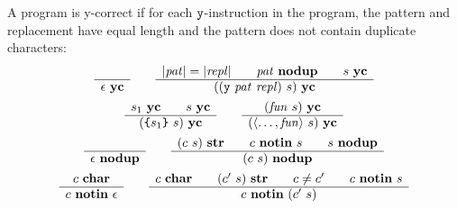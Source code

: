 \documentclass[11pt]{article}
\newcommand\RULE[3][]{\begin{array}{c} #2 \\ \hline #3 \end{array}}
\newcommand\J[1]{\ensuremath{\textbf{#1}}}
\newcommand\cmd[1]{\ensuremath{\text{\texttt{#1}}}}
\renewcommand\arg[1]{\ensuremath{\mathit{#1}}}
\newcommand\angles[1]{\langle #1 \rangle}
\begin{document}
A program is y-correct if for each \cmd{y}-instruction in the program, the pattern and replacement have equal length and the pattern does not contain duplicate characters:
\begin{gather*}
	\RULE{}{\epsilon\ \J{yc}} \qquad
	\RULE{|\arg{pat}| = |\arg{repl}| \qquad \arg{pat}\ \J{nodup} \qquad s\ \J{yc}}{((\cmd{y}\ \arg{pat}\ \arg{repl})\ s)\ \J{yc}} \\
%
	\RULE{s_1\ \J{yc} \qquad s\ \J{yc}}{(\cmd{\{} s_1 \cmd{\}}\ s)\ \J{yc}} \qquad
	\RULE{(\arg{fun}\ s)\ \J{yc}}{(\angles{\ldots, \arg{fun}}\ s)\ \J{yc}} \\
	\RULE{}{\epsilon\ \J{nodup}} \qquad
	\RULE{(c\ s)\ \J{str} \qquad c\ \J{notin}\ s \qquad s\ \J{nodup}}{(c\ s)\ \J{nodup}} \\
	\RULE{c\ \J{char}}{c\ \J{notin}\ \epsilon} \qquad
	\RULE{c\ \J{char} \qquad (c'\ s)\ \J{str} \qquad c \not= c' \qquad c\ \J{notin}\ s}{c\ \J{notin}\ (c'\ s)}
\end{gather*}
\end{document}
